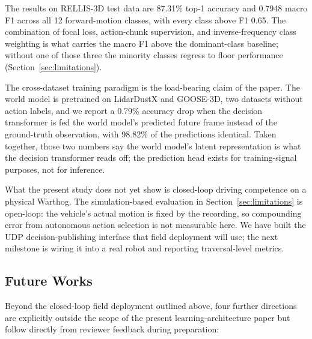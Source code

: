 \documentclass[sensors,article,submit,pdftex,moreauthors]{Definitions/mdpi}
\begin{document}
The results on RELLIS-3D test data are 87.31\% top-1 accuracy and 0.7948 macro F1 across all 12 forward-motion classes, with every class above F1 0.65. The combination of focal loss, action-chunk supervision, and inverse-frequency class weighting is what carries the macro F1 above the dominant-class baseline; without one of those three the minority classes regress to floor performance (Section~\ref{sec:limitations}).

The cross-dataset training paradigm is the load-bearing claim of the paper. The world model is pretrained on LidarDustX and GOOSE-3D, two datasets without action labels, and we report a 0.79\% accuracy drop when the decision transformer is fed the world model's predicted future frame instead of the ground-truth observation, with 98.82\% of the predictions identical. Taken together, those two numbers say the world model's latent representation is what the decision transformer reads off; the prediction head exists for training-signal purposes, not for inference.

What the present study does not yet show is closed-loop driving competence on a physical Warthog. The simulation-based evaluation in Section~\ref{sec:limitations} is open-loop: the vehicle's actual motion is fixed by the recording, so compounding error from autonomous action selection is not measurable here. We have built the UDP decision-publishing interface that field deployment will use; the next milestone is wiring it into a real robot and reporting traversal-level metrics.

\subsection{Future Works}
\label{sec:future_works}

Beyond the closed-loop field deployment outlined above, four further directions are explicitly outside the scope of the present learning-architecture paper but follow directly from reviewer feedback during preparation:
\end{document}
